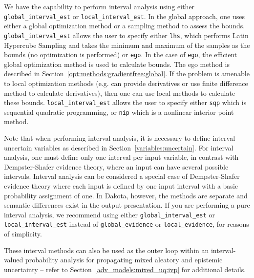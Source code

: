 We have the capability to perform interval analysis using either
\texttt{global\_interval\_est} or \texttt{local\_interval\_est}.  In
the global approach, one uses either a global optimization method or a
sampling method to assess the bounds.  \texttt{global\_interval\_est}
allows the user to specify either \texttt{lhs}, which performs Latin
Hypercube Sampling and takes the minimum and maximum of the samples as
the bounds (no optimization is performed) or \texttt{ego}. In the case
of \texttt{ego}, the efficient global optimization method is used to
calculate bounds. The ego method is described in
Section~\ref{opt:methods:gradientfree:global}.  If the problem is
amenable to local optimization methods (e.g. can provide derivatives
or use finite difference method to calculate derivatives), then one
can use local methods to calculate these
bounds. \texttt{local\_interval\_est} allows the user to specify
either \texttt{sqp} which is sequential quadratic programming, or
\texttt{nip} which is a nonlinear interior point method.

Note that when performing interval analysis, it is necessary to define
interval uncertain variables as described in
Section~\ref{variables:uncertain}. For interval analysis, one must
define only one interval per input variable, in contrast with
Dempster-Shafer evidence theory, where an input can have several
possible intervals. Interval analysis can be considered a special
case of Dempster-Shafer evidence theory where each input is defined by
one input interval with a basic probability assignment of one. In
Dakota, however, the methods are separate and semantic differences
exist in the output presentation. If you are performing a pure
interval analysis, we recommend using either
\texttt{global\_interval\_est} or \texttt{local\_interval\_est}
instead of \texttt{global\_evidence} or \texttt{local\_evidence}, for
reasons of simplicity. %

These interval methods can also be used as the outer loop within an
interval-valued probability analysis for propagating mixed aleatory
and epistemic uncertainty -- refer to
Section~\ref{adv_models:mixed_uq:ivp} for additional details.

